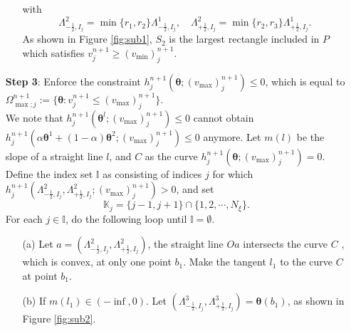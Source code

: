 \documentclass[times,final,11pt]{elsarticle}
\numberwithin{equation}{section}
\theoremstyle{definition}
\theoremstyle{remark}
\begin{document}
\begin{enumerate}[label=(\roman*),leftmargin=6mm]
\begin{enumerate}
\begin{equation*}
		\end{equation*}
		with
		\begin{equation*}
		    \Lambda_{- \frac{1}{2}, I_j}^2 = \min \{ r_1, r_2 \}\Lambda_{- \frac{1}{2}, I_j}^1, \quad \Lambda_{+ \frac{1}{2}, I_j}^2 = \min \{ r_2, r_3 \}\Lambda_{+ \frac{1}{2}, I_j}^1.
		\end{equation*}
		As shown in Figure \ref{fig:sub1}, $S_2$ is the largest rectangle included in $P$ which satisfies $v_j^{n + 1} \geq (v_{\min})_j^{n + 1}$.
		
	\end{enumerate}

	\item[\textbf{Step 3}:]Enforce the constraint $h_{j}^{n + 1} (\boldsymbol{\theta}; (v_{\max})_j^{n + 1}) \leq 0$, which is equal to $\Omega_{{\max};j}^{n+1} := \{\boldsymbol{\theta}: v_j^{n + 1} \leq (v_{\max})_j^{n + 1}\}$. \\
	We note that $h_{j}^{n + 1}(\boldsymbol{\theta}^l; (v_{\max})_j^{n + 1}) \leq 0$ cannot obtain $h_{j}^{n + 1}(\alpha \boldsymbol{\theta}^1 + (1 - \alpha) \boldsymbol{\theta}^2; (v_{\max})_j^{n + 1}) \leq 0$ anymore. Let $m(l)$ be the slope of a straight line $l$, and $C$ as the curve $h_{j}^{n + 1}(\boldsymbol{\theta}; (v_{\max})_j^{n + 1}) = 0$. Define the index set $\mathbb{I}$ as consisting of indices $j$ for which $h_{j}^{n + 1} (\Lambda_{- \frac{1}{2}, I_j}^2, \Lambda_{+ \frac{1}{2}, I_j}^2; (v_{\max})_j^{n + 1}) > 0$, and set 
	\begin{equation*}
		\mathbb{K}_j = \{j - 1, j + 1\} \cap \{ 1, 2, \cdots, N_\xi \}. 
	\end{equation*}
	For each $j \in \mathbb{I}$, do the following loop until $\mathbb{I} = \emptyset$.
	\begin{enumerate}
		\item[(a)] Let $a = (\Lambda_{- \frac{1}{2}, I_j}^2, \Lambda_{+ \frac{1}{2}, I_j}^2)$, the straight line $Oa$ intersects the curve $C$ , which is convex, at only one point $b_1$. Make the tangent $l_1$ to the curve $C$ at point $b_1$.

		\item[(b)] If $m(l_1) \in (-\inf, 0)$. Let $(\Lambda_{- \frac{1}{2}, I_j}^3, \Lambda_{+ \frac{1}{2}, I_j}^3) = \boldsymbol{\theta}(b_1)$, as shown in Figure \ref{fig:sub2}.


\end{enumerate}
\end{enumerate}
\end{document}
